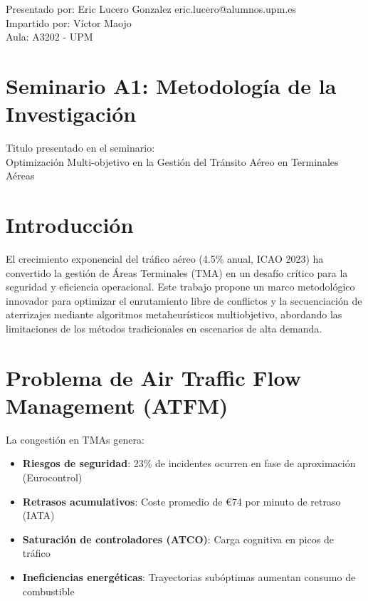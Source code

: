 \begin{flushleft}
    {\color{colorC} Presentado por: Eric Lucero Gonzalez \hfill eric.lucero@alumnos.upm.es} \\
    {\color{colorC} Impartido por: Víctor Maojo \\Aula: A3202 - UPM}
    \section{Seminario A1: Metodología de la Investigación}
    Titulo presentado en el seminario:\\
    {\Large Optimización Multi-objetivo en la Gestión del Tránsito Aéreo en Terminales Aéreas} \\
\end{flushleft}
\begin{minipage}{0.48\textwidth}
    \section{Introducción}
    El crecimiento exponencial del tráfico aéreo (4.5\% anual, ICAO 2023) ha convertido la gestión de Áreas Terminales (TMA) en un desafío crítico para la seguridad y eficiencia operacional. Este trabajo propone un marco metodológico innovador para optimizar el enrutamiento libre de conflictos y la secuenciación de aterrizajes mediante algoritmos metaheurísticos multiobjetivo, abordando las limitaciones de los métodos tradicionales en escenarios de alta demanda.

    \section{Problema de Air Traffic Flow Management (ATFM)}
    La congestión en TMAs genera:
    \begin{itemize}[itemsep=1mm]\small
        \item \textbf{Riesgos de seguridad}: 23\% de incidentes ocurren en fase de aproximación (Eurocontrol)
        \item \textbf{Retrasos acumulativos}: Coste promedio de €74 por minuto de retraso (IATA)
        \item \textbf{Saturación de controladores (ATCO)}: Carga cognitiva en picos de tráfico
        \item \textbf{Ineficiencias energéticas}: Trayectorias subóptimas aumentan consumo de combustible
    \end{itemize}
    \vfill
\end{minipage}
\hfill
